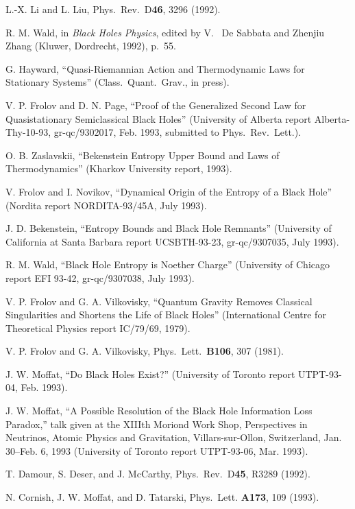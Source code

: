 \begin{thebibliography}{999}
 L.-X. Li and L. Liu, Phys.\ Rev.\ D{\bf 46}, 3296
(1992).

 R. M. Wald, in {\em Black Holes Physics}, edited by
V.~
 De Sabbata and Zhenjiu Zhang (Kluwer, Dordrecht, 1992), p.~55.

  G. Hayward, ``Quasi-Riemannian Action and
 Thermodynamic Laws for Stationary Systems''
 (Class.\ Quant.\ Grav., in press).

 V. P. Frolov and D. N. Page, ``Proof of the
Generalized
Second Law for Quasistationary Semiclassical Black Holes''
(University
of Alberta report Alberta-Thy-10-93, gr-qc/9302017, Feb. 1993,
submitted to Phys.\ Rev.\ Lett.).

 O. B. Zaslavskii, ``Bekenstein Entropy Upper
Bound and Laws of Thermodynamics'' (Kharkov University report, 1993).

 V. Frolov and I. Novikov,
``Dynamical Origin of the Entropy of a Black Hole''
(Nordita report NORDITA-93/45A, July 1993).

 J. D. Bekenstein, ``Entropy Bounds and Black Hole
Remnants''
(University of California at Santa Barbara report UCSBTH-93-23,
gr-qc/9307035,
July 1993).

 R. M. Wald, ``Black Hole Entropy is Noether Charge''
(University of Chicago report EFI 93-42, gr-qc/9307038, July 1993).

 V. P. Frolov and G. A. Vilkovisky, ``Quantum Gravity
Removes Classical Singularities and Shortens the Life of Black
Holes''
(International Centre for Theoretical Physics report IC/79/69, 1979).

 V. P. Frolov and G. A. Vilkovisky, Phys.\ Lett.\
{\bf B106}, 307 (1981).

 J. W. Moffat, ``Do Black Holes Exist?'' (University
of Toronto
report UTPT-93-04, Feb. 1993).

 J. W. Moffat, ``A Possible Resolution of the Black
Hole
Information Loss Paradox,'' talk given at the XIIIth Moriond Work
Shop,
Perspectives in Neutrinos, Atomic Physics and Gravitation,
Villars-sur-Ollon,
Switzerland, Jan. 30--Feb. 6, 1993 (University of Toronto
report UTPT-93-06, Mar. 1993).

 T. Damour, S. Deser, and J. McCarthy,
Phys.\ Rev.\ D{\bf 45}, R3289 (1992).

 N. Cornish, J. W. Moffat, and D. Tatarski,
Phys.\ Lett. {\bf A173}, 109 (1993).


\end{thebibliography}
